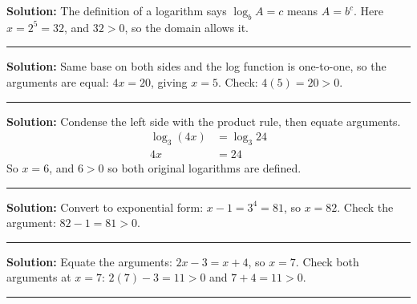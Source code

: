 \documentclass[12pt]{article}
\begin{document}



\textbf{Solution:} The definition of a logarithm says $\log_{b} A = c$ means $A = b^{c}$. Here $x = 2^{5} = 32$, and $32 > 0$, so the domain allows it. 

\vspace{0.1cm}\noindent\rule{\linewidth}{0.2pt}


\textbf{Solution:} Same base on both sides and the log function is one-to-one, so the arguments are equal: $4x = 20$, giving $x = 5$. Check: $4(5) = 20 > 0$. 

\vspace{0.1cm}\noindent\rule{\linewidth}{0.2pt}


\textbf{Solution:} Condense the left side with the product rule, then equate arguments.
\begin{align*}
  \log_{3}(4x) &= \log_{3} 24 \\
  4x &= 24
\end{align*}
So $x = 6$, and $6 > 0$ so both original logarithms are defined. 

\vspace{0.1cm}\noindent\rule{\linewidth}{0.2pt}


\textbf{Solution:} Convert to exponential form: $x - 1 = 3^{4} = 81$, so $x = 82$. Check the argument: $82 - 1 = 81 > 0$. 

\vspace{0.1cm}\noindent\rule{\linewidth}{0.2pt}


\textbf{Solution:} Equate the arguments: $2x - 3 = x + 4$, so $x = 7$. Check both arguments at $x = 7$: $2(7) - 3 = 11 > 0$ and $7 + 4 = 11 > 0$. 

\vspace{0.1cm}\noindent\rule{\linewidth}{0.2pt}

\end{document}
